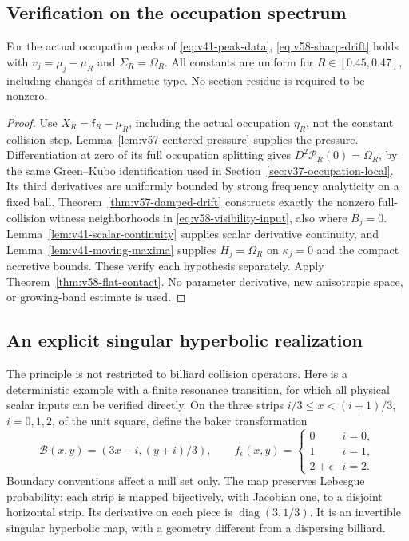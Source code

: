 \subsection{Verification on the occupation spectrum}
\begin{corollary}
\label{cor:v58-lorentz-contact}
For the actual occupation peaks of \eqref{eq:v41-peak-data},
\eqref{eq:v58-sharp-drift} holds with
$v_j=\mu_j-\mu_R$ and $\Sigma_R=\Omega_R$.
All constants are uniform for $R\in[0.45,0.47]$, including changes
of arithmetic type. No section residue is required to be nonzero.
\end{corollary}
\begin{proof}
Use $X_R=\mathsf f_R-\mu_R$, including the actual occupation
$\eta_R$, not the constant collision step. Lemma~\ref{lem:v57-centered-pressure}
supplies the pressure. Differentiation at zero of its full occupation
splitting gives $D^2\mathscr P_R(0)=\Omega_R$, by the same
Green--Kubo identification used in Section~\ref{sec:v37-occupation-local}.
Its third derivatives are uniformly bounded by strong frequency
analyticity on a fixed ball. Theorem~\ref{thm:v57-damped-drift}
constructs exactly the nonzero full-collision witness neighborhoods
in \eqref{eq:v58-visibility-input}, also where $B_j=0$.
Lemma~\ref{lem:v41-scalar-continuity} supplies scalar derivative
continuity, and Lemma~\ref{lem:v41-moving-maxima} supplies
$H_j=\Omega_R$ on $\kappa_j=0$ and the compact accretive bounds.
These verify each hypothesis separately. Apply
Theorem~\ref{thm:v58-flat-contact}. No parameter derivative, new
anisotropic space, or growing-band estimate is used.
\end{proof}

\subsection{An explicit singular hyperbolic realization}
The principle is not restricted to billiard collision operators.
Here is a deterministic example with a finite resonance transition,
for which all physical scalar inputs can be verified directly.
On the three strips $i/3\le x<(i+1)/3$, $i=0,1,2$, of the unit
square, define the baker transformation
\begin{equation}\label{eq:v58-baker-map}
 \mathcal B(x,y)=(3x-i,(y+i)/3),\qquad
 f_\epsilon(x,y)=\begin{cases}0&i=0,\\1&i=1,\\2+\epsilon&i=2.\end{cases}
\end{equation}
Boundary conventions affect a null set only. The map preserves
Lebesgue probability: each strip is mapped bijectively, with Jacobian
one, to a disjoint horizontal strip. Its derivative on each piece is
$\operatorname{diag}(3,1/3)$. It is an invertible singular hyperbolic
map, with a geometry different from a dispersing billiard.

